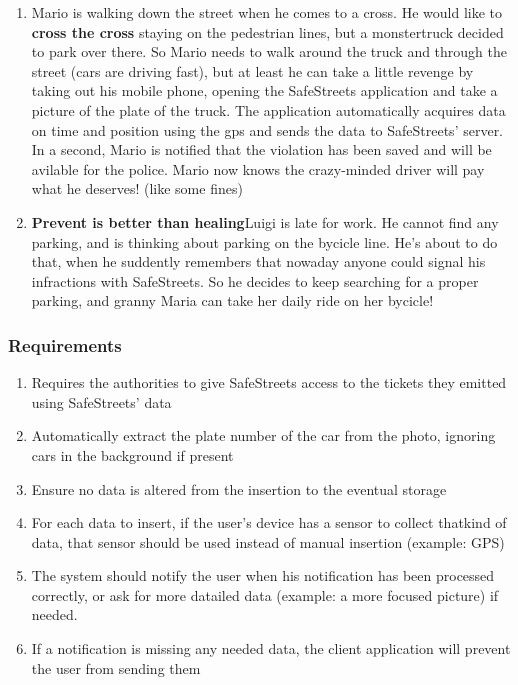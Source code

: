 \documentclass{article}
\newcommand{\enum}[1]{\texttt{#1.\arabic*}}
\begin{document}
			\begin{enumerate}[label=\enum{S}]
				\item \label{S_The man, the street and the monstertruck}
				Mario is walking down the street when he comes to a cross. He would like to \textbf{cross the cross} staying on the pedestrian lines, but a monstertruck decided to park over there. So Mario needs to walk around the truck and through the street (cars are driving fast), but at least he can take a little revenge by taking out his mobile phone, opening the SafeStreets application and take a picture of the plate of the truck. The application automatically acquires data on time and position using the gps and sends the data to SafeStreets' server. In a second, Mario is notified that the violation has been saved and will be avilable for the police.
Mario now knows the crazy-minded driver will pay what he deserves! (like some fines)
				\item \textbf{Prevent is better than healing}Luigi is late for work. He cannot find any parking, and is thinking about parking on the bycicle line. He's about to do that, when he suddently remembers that nowaday anyone could signal his infractions with SafeStreets. So he decides to keep searching for a proper parking, and granny Maria can take her daily ride on her bycicle!
			\end{enumerate}
			
		\subsubsection{Requirements}
		
			\begin{enumerate}[label=\enum{R}]
				\item \label{R_storeTickets}Requires the authorities to give SafeStreets access to the tickets they emitted using SafeStreets' data
				\item \label{R_autoPlate}Automatically extract the plate number of the car from the photo, ignoring cars in the background if present
				\item \label{R_unalteredData}Ensure no data is altered from the insertion to the eventual storage
				\item \label{R_dataGather}For each data to insert, if the  user's device has a sensor to collect thatkind of data, that sensor should be used instead of manual insertion (example: GPS)
				\item \label{R_notifyUser}The system should notify the user when his notification has been processed correctly, or ask for more datailed data (example: a more focused picture) if needed.
				\item \label{R_fullData}If a notification is missing any needed data, the client application will prevent the user from sending them
			\end{enumerate}
			
\end{document}
